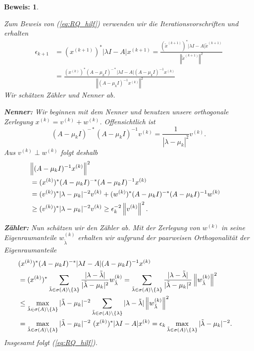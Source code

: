 \documentclass[
]{mycourse}
\theoremstyle{mythm}
\theoremstyle{break}
\newtheorem*{beweis}{Beweis:}
\newcommand{\norm}[1]{\left\Vert#1\right\Vert}		%
\newcommand{\req}[1]{(\ref{eq:#1})}
\begin{document}
\begin{beweis}
\begin{enumerate}[(a)]
Zum Beweis von \req{RQ_hilf} verwenden wir die Iterationsvorschriften und erhalten %
\begin{align*}
\epsilon_{k+1}&=(x^{(k+1)})^* |\lambda I -  A| x^{(k+1)} 
= \frac{ (\tilde x^{(k+1)})^* |\lambda I -  A| \tilde x^{(k+1)}}{  \norm{\tilde x^{(k+1)}}^2 }\\
&= \frac{ (x^{(k)})^* (A-\mu_{k} I)^{-*}  | \lambda I -  A | (A-\mu_{k} I)^{-1} x^{(k)}}
{  \norm{ (A-\mu_{k} I)^{-1} x^{(k)} }^2}
\end{align*}
Wir schätzen Zähler und Nenner ab. 

\textbf{Nenner:} Wir beginnen mit dem Nenner und benutzen unsere orthogonale Zerlegung $x^{(k)}=v^{(k)} + w^{(k)}$.
Offensichtlich ist 
\[
(A-\mu_{k} I)^{-*} (A-\mu_{k} I)^{-1} v^{(k)}=\frac{1}{|\lambda-\mu_k|^2} v^{(k)}.
\]
Aus $v^{(k)}\perp w^{(k)}$ folgt deshalb
\begin{align*}
\lefteqn{\norm{ (A-\mu_{k} I)^{-1} x^{(k)} }^2}\\
&=  {(x^{(k)})^* (A-\mu_{k} I)^{-*} (A-\mu_{k} I)^{-1} x^{(k)}}\\
& = {(v^{(k)})^* | \lambda-\mu_{k} |^{-2} v^{(k)}} + {(w^{(k)})^* (A-\mu_{k} I)^{-*} (A-\mu_{k} I)^{-1} w^{(k)}}\\
& \geq {(v^{(k)})^* |\lambda-\mu_{k}|^{-2} v^{(k)}} \geq \epsilon_k^{-2} \norm{v^{(k)}}^2.
\end{align*}

\textbf{Zähler:} Nun schätzen wir den Zähler ab. Mit der Zerlegung von $w^{(k)}$ in seine Eigenraumanteile $w^{(k)}_{\tilde \lambda}$
erhalten wir aufgrund der paarweisen Orthogonalität der Eigenraumanteile
\begin{align*}
\lefteqn{(x^{(k)})^* (A-\mu_{k} I)^{-*}  | \lambda I -  A | (A-\mu_{k} I)^{-1} x^{(k)}}\\
&=(x^{(k)})^*  \sum_{\tilde \lambda\in \sigma(A)\setminus \{\lambda\} } \frac{|\lambda-\tilde \lambda|}{|\tilde\lambda-\mu_k|^2} w^{(k)}_{\tilde \lambda}
= \sum_{\tilde \lambda\in \sigma(A)\setminus \{\lambda\} } \frac{|\lambda-\tilde \lambda|}{ | \tilde\lambda-\mu_k |^2} \norm{w^{(k)}_{\tilde \lambda}}^2\\
%
&\leq \max\limits_{ \tilde \lambda\in \sigma(A)\setminus \{\lambda\} } |\tilde\lambda-\mu_k|^{-2}
 \sum_{\tilde \lambda\in \sigma(A)\setminus \{\lambda\} } |\lambda-\tilde \lambda|  \norm{w^{(k)}_{\tilde \lambda}}^2\\
%
&= \max\limits_{ \tilde \lambda\in \sigma(A)\setminus \{\lambda\} } |\tilde\lambda-\mu_k|^{-2}\ 
{(x^{(k)})^* | \lambda I -  A | x^{(k)}}
= \epsilon_k \max\limits_{ \tilde \lambda\in \sigma(A)\setminus \{\lambda\} } |\tilde\lambda-\mu_k|^{-2}.
\end{align*}
Insgesamt folgt \req{RQ_hilf}.
\end{enumerate}
\end{beweis}
\end{document}

